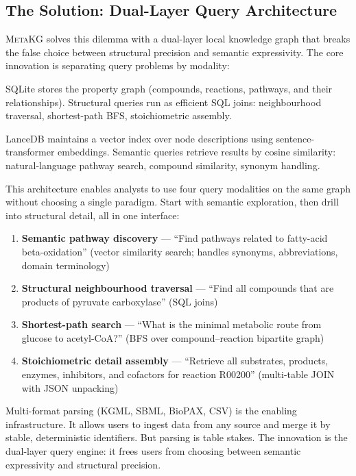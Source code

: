 \documentclass[10pt]{article}
\begin{document}
\subsection{The Solution: Dual-Layer Query Architecture}

\textsc{MetaKG} solves this dilemma with a dual-layer local knowledge graph
that breaks the false choice between structural precision and semantic
expressivity. The core innovation is separating query problems by modality:

\begin{description}[leftmargin=*,itemsep=2pt]
\item[Structural layer] SQLite stores the property graph (compounds, reactions,
  pathways, and their relationships). Structural queries run as efficient SQL
  joins: neighbourhood traversal, shortest-path BFS, stoichiometric assembly.
\item[Semantic layer] LanceDB maintains a vector index over node descriptions
  using sentence-transformer embeddings. Semantic queries retrieve results by
  cosine similarity: natural-language pathway search, compound similarity,
  synonym handling.
\end{description}

This architecture enables analysts to use four query modalities on the same
graph without choosing a single paradigm. Start with semantic exploration, then
drill into structural detail, all in one interface:

\begin{enumerate}[leftmargin=*, itemsep=2pt]
\item \textbf{Semantic pathway discovery} --- ``Find pathways related to
  fatty-acid beta-oxidation'' (vector similarity search; handles synonyms,
  abbreviations, domain terminology)
\item \textbf{Structural neighbourhood traversal} --- ``Find all compounds
  that are products of pyruvate carboxylase'' (SQL joins)
\item \textbf{Shortest-path search} --- ``What is the minimal metabolic route
  from glucose to acetyl-CoA?'' (BFS over compound--reaction bipartite graph)
\item \textbf{Stoichiometric detail assembly} --- ``Retrieve all substrates,
  products, enzymes, inhibitors, and cofactors for reaction R00200''
  (multi-table JOIN with JSON unpacking)
\end{enumerate}

Multi-format parsing (KGML, SBML, BioPAX, CSV) is the enabling infrastructure.
It allows users to ingest data from any source and merge it by stable,
deterministic identifiers. But parsing is table stakes. The innovation is the
dual-layer query engine: it frees users from choosing between semantic
expressivity and structural precision.
\end{document}

